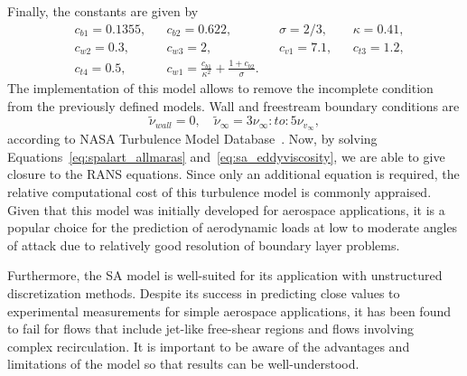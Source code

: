 Finally, the constants are given by 
\begin{align}
    &c_{b1} = 0.1355,& &c_{b2} =0.622,& &\sigma = 2/3,& &\kappa=0.41, \\
    &c_{w2} = 0.3,&    &c_{w3} =2,&     &c_{v1} = 7.1,&   &c_{t3}=1.2,  \\
    &c_{t4} = 0.5,&      &c_{w1} = \frac{c_{b1}}{\kappa^2} + \frac{1+c_{b2}}{\sigma}.
\end{align}
The implementation of this model allows to remove the incomplete condition from the previously defined models. Wall and freestream boundary conditions are
\begin{equation}
    \tilde \nu_{wall} = 0,\quad \tilde\nu_{\infty}=3 \nu_{\infty}:to:5\nu_{v_\infty},
\end{equation}
according to NASA Turbulence Model Database~\cite{}. Now, by solving Equations~\ref{eq:spalart_allmaras} and~\ref{eq:sa_eddyviscosity}, we are able to give closure to the RANS equations. Since only an additional equation is required, the relative computational cost of this turbulence model is commonly appraised. Given that this model was initially developed for aerospace applications, it is a popular choice for the prediction of aerodynamic loads at low to moderate angles of attack due to relatively good resolution of boundary layer problems. 

Furthermore, the SA model is well-suited for its application with unstructured discretization methods. Despite its success in predicting close values to experimental measurements for simple aerospace applications, it has been found to fail for flows that include jet-like free-shear regions and flows involving complex recirculation. It is important to be aware of the advantages and limitations of the model so that results can be well-understood.

